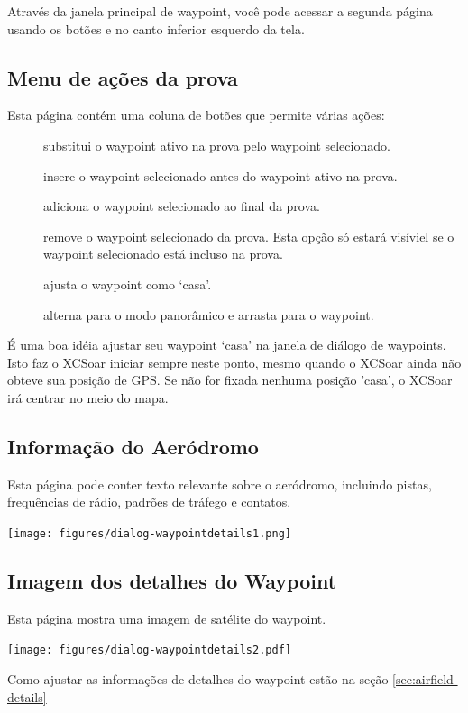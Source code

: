 Através da janela principal de waypoint, você pode acessar a segunda página usando os botões 
\bmenuw{$>$} e \bmenuw{$<$} no canto inferior esquerdo da tela.  
\subsection*{Menu de ações da prova}  
Esta página contém uma coluna de botões que permite várias ações:
\begin{description}
\item[] substitui o waypoint ativo na prova pelo waypoint selecionado.
\item[] insere o waypoint selecionado antes do waypoint ativo na prova.
\item[] adiciona o waypoint selecionado ao final da prova.
\item[] remove o waypoint selecionado da prova.  Esta opção só estará visíviel se o waypoint selecionado está incluso na prova.
\item[] ajusta o waypoint como ‘casa’.
\item[] alterna para o modo panorâmico e arrasta para o waypoint.
\end{description}

É uma boa idéia ajustar seu waypoint ‘casa’ na janela de diálogo de waypoints.  Isto faz o XCSoar iniciar sempre neste ponto, mesmo quando o XCSoar ainda não obteve sua posição de GPS.  Se não for fixada nenhuma posição 'casa', o XCSoar irá centrar no meio do mapa.

\subsection*{Informação do Aeródromo}
Esta página pode conter texto relevante sobre o aeródromo, incluindo pistas, frequências de rádio, padrões de tráfego e contatos.
\begin{center}
\texttt{[image: figures/dialog-waypointdetails1.png]}
\end{center}

\subsection*{Imagem dos detalhes do Waypoint}
Esta página mostra uma imagem de satélite do waypoint.

\begin{center}
\texttt{[image: figures/dialog-waypointdetails2.pdf]}
\end{center}
Como ajustar as informações de detalhes do waypoint estão na seção \ref{sec:airfield-details}


